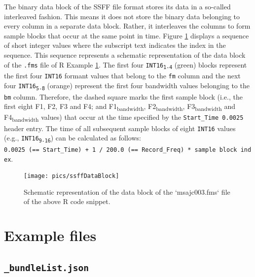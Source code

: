 \documentclass[]{book}
\begin{document}
The binary data block of the SSFF file format stores its data in a so-called interleaved fashion. This means it does not store the binary data belonging to every column in a separate data block. Rather, it interleaves the columns to form sample blocks that occur at the same point in time. Figure \ref{fig:wrassp-ssffDataBlock} displays a sequence of short integer values where the subscript text indicates the index in the sequence. This sequence represents a schematic representation of the data block of the \texttt{.fms} file of R Example \ref{fig:wrassp-ssffDataBlock}. The first four {\texttt{INT16}\textsubscript{\texttt{1-4}}} (green) blocks represent the first four \texttt{INT16} formant values that belong to the \texttt{fm} column and the next four {\texttt{INT16}\textsubscript{\texttt{5-8}}} (orange) represent the first four bandwidth values belonging to the \texttt{bm} column. Therefore, the dashed square marks the first sample block (i.e., the first eight F1, F2, F3 and F4; and F1\textsubscript{bandwidth}, F2\textsubscript{bandwidth}, F3\textsubscript{bandwidth} and F4\textsubscript{bandwidth} values) that occur at the time specified by the \texttt{Start\_Time\ 0.0025} header entry. The time of all subsequent sample blocks of eight \texttt{INT16} values (e.g., \texttt{INT16}\textsubscript{\texttt{9-16}}) can be calculated as follows:
\texttt{0.0025\ (==\ Start\_Time)\ +\ 1\ /\ 200.0\ (==\ Record\_Freq)\ *\ sample\ block\ index}.

\begin{figure}

{\centering \texttt{[image: pics/ssffDataBlock]} 

}

\caption{Schematic representation of the data block of the `msajc003.fms` file of the above R code snippet.}\label{fig:wrassp-ssffDataBlock}
\end{figure}

\hypertarget{example-files}{%
\section{Example files}\label{example-files}}

\hypertarget{subsec:app-chapExampleFilesBundleList}{%
\subsection{\texorpdfstring{\texttt{\_bundleList.json}}{\_bundleList.json}}\label{subsec:app-chapExampleFilesBundleList}}
\end{document}
